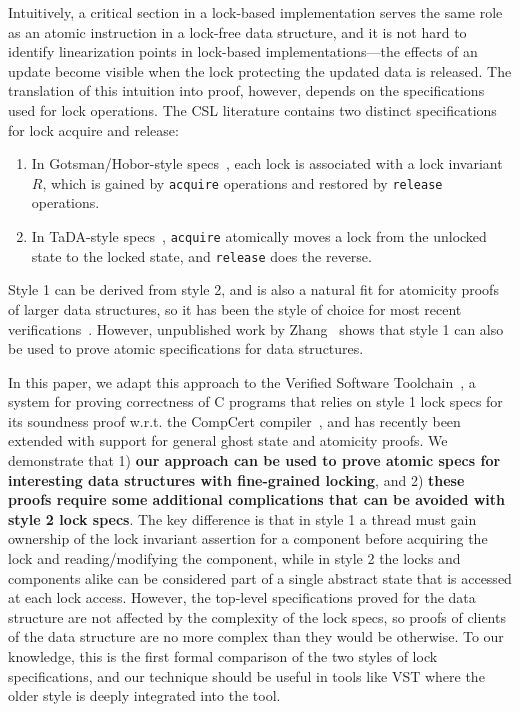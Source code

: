 Intuitively, a critical section in a lock-based implementation serves the same role as an atomic instruction in a lock-free data structure, and it is not hard to identify linearization points in lock-based implementations---the effects of an update become visible when the lock protecting the updated data is released. The translation of this intuition into proof, however, depends on the specifications used for lock operations. The CSL literature contains two distinct specifications for lock acquire and release:
\begin{enumerate}
\item In Gotsman/Hobor-style specs~\cite{gotsman,oraclesematic}, each lock is associated with a lock invariant $R$, which is gained by \texttt{acquire} operations and restored by \texttt{release} operations.
\item In TaDA-style specs~\cite{tada}, \texttt{acquire} atomically moves a lock from the unlocked state to the locked state, and \texttt{release} does the reverse.
\end{enumerate}
Style 1 can be derived from style 2, and is also a natural fit for atomicity proofs of larger data structures, so it has been the style of choice for most recent verifications~\cite{tada-live,templates}. However, unpublished work by Zhang~\cite{atomic-syncer} shows that style 1 can also be used to prove atomic specifications for data structures.

In this paper, we adapt this approach to the Verified Software Toolchain~\cite{plfcc}, a system for proving correctness of C programs that relies on style 1 lock specs for its soundness proof w.r.t. the CompCert compiler~\cite{compcert}, and has recently been extended with support for general ghost state and atomicity proofs. We demonstrate that 1) \textbf{our approach can be used to prove atomic specs for interesting data structures with fine-grained locking}, and 2) \textbf{these proofs require some additional complications that can be avoided with style 2 lock specs}. The key difference is that in style 1 a thread must gain ownership of the lock invariant assertion for a component before acquiring the lock and reading/modifying the component, while in style 2 the locks and components alike can be considered part of a single abstract state that is accessed at each lock access. However, the top-level specifications proved for the data structure are not affected by the complexity of the lock specs, so proofs of clients of the data structure are no more complex than they would be otherwise. To our knowledge, this is the first formal comparison of the two styles of lock specifications, and our technique should be useful in tools like VST where the older style is deeply integrated into the tool.

